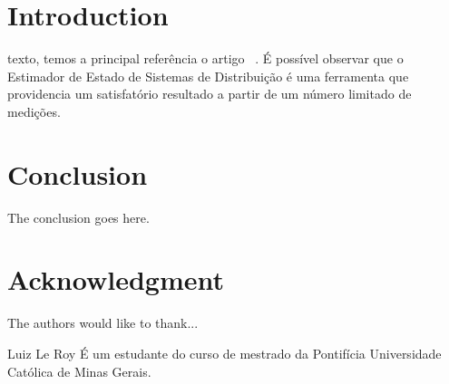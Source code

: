 \documentclass[journal]{IEEEtran}
\begin{document}
%
\IEEEpeerreviewmaketitle



\section{Introduction}
 texto, temos a principal referência o artigo ~\cite{IEEE-ann:principal}. É possível observar que o Estimador de Estado de Sistemas de Distribuição é uma ferramenta que providencia um satisfatório resultado a partir de um número limitado de medições.

\section{Conclusion}
The conclusion goes here.


\section*{Acknowledgment}
The authors would like to thank...


\ifCLASSOPTIONcaptionsoff
  \newpage
\fi


\begin{IEEEbiographynophoto}{Luiz Le Roy}
\'E um estudante do curso de mestrado da Pontif\'icia Universidade Cat\'olica de Minas Gerais.
\end{IEEEbiographynophoto}

\end{document}
